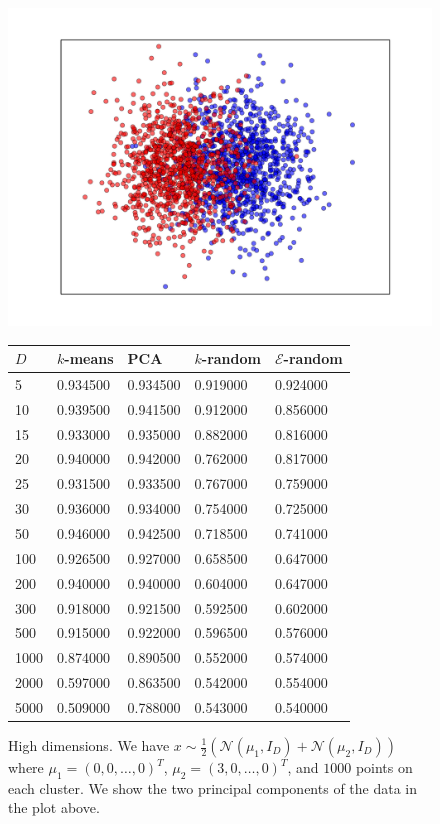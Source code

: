 \documentclass[aps,preprint,nofootinbib,floatfix]{revtex4-1}
\begin{document}
\begin{figure}
\begin{minipage}{.49\textwidth}
\centering
\includegraphics[scale=.45]{30d_gauss.pdf}
\end{minipage}
\begin{minipage}{.5\textwidth}
\renewcommand*{\arraystretch}{.3}
\begin{tabular}{l l l l l}
\hline
$D$ & $k$-means & PCA & $k$-random & $\mathcal{E}$-random \\
\hline
%
5 & 0.934500 & 0.934500 & 0.919000 & 0.924000 \\
10 & 0.939500 & 0.941500 & 0.912000 & 0.856000 \\
15 & 0.933000 & 0.935000 & 0.882000 & 0.816000 \\
20 & 0.940000 & 0.942000 & 0.762000 & 0.817000 \\
25 & 0.931500 & 0.933500 & 0.767000 & 0.759000 \\
30 & 0.936000 & 0.934000 & 0.754000 & 0.725000 \\
50 & 0.946000 & 0.942500 & 0.718500 & 0.741000 \\
100 & 0.926500 & 0.927000 & 0.658500 & 0.647000 \\
200 & 0.940000 & 0.940000 & 0.604000 & 0.647000 \\
300 & 0.918000 & 0.921500 & 0.592500 & 0.602000 \\
500 & 0.915000 & 0.922000 & 0.596500 & 0.576000 \\
1000 & 0.874000 & 0.890500 & 0.552000 & 0.574000 \\
2000 & 0.597000 & 0.863500 & 0.542000 & 0.554000 \\
5000 & 0.509000 & 0.788000 & 0.543000 & 0.540000 \\
%
\hline
\end{tabular}
\end{minipage}
\caption{\label{fig:highd}
High dimensions.
We have $x \sim \tfrac{1}{2}\left( \mathcal{N}(\mu_1, I_D) +
\mathcal{N}(\mu_2, I_D)\right)$ where $\mu_1 = (0,0,\dotsc,0)^T$,
$\mu_2=(3,0,\dots,0)^T$,
and $1000$ points on each cluster. We show the two principal components
of the data in the plot above.
}
\end{figure}
\end{document}
